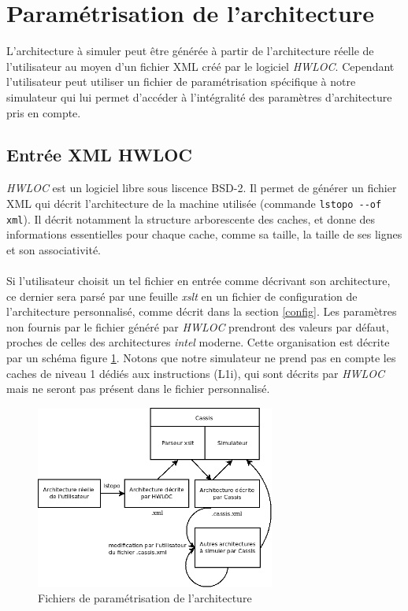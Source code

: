 \section{Paramétrisation de l'architecture}

\label{param_xml}
L'architecture à simuler peut être générée à partir de l'architecture réelle de l'utilisateur au moyen d'un fichier XML créé par le logiciel \emph{HWLOC}. Cependant l'utilisateur peut utiliser un fichier de paramétrisation spécifique à notre simulateur qui lui permet d'accéder à l'intégralité des paramètres d'architecture pris en compte.

\subsection{Entrée XML HWLOC}

\emph{HWLOC} est un logiciel libre sous liscence BSD-2. Il permet de générer un fichier XML qui décrit l'architecture de la machine utilisée (commande \verb?lstopo --of xml?). Il décrit notamment la structure arborescente des caches, et donne des informations essentielles pour chaque cache, comme sa taille, la taille de ses lignes et son associativité. 

\paragraph{}
Si l'utilisateur choisit un tel fichier en entrée comme décrivant son architecture, ce dernier sera parsé par une feuille \textit{xslt} en un fichier de configuration de l'architecture personnalisé, comme décrit dans la section \ref{config}. Les paramètres non fournis par le fichier généré par \emph{HWLOC} prendront des valeurs par défaut, proches de celles des architectures \emph{intel} moderne. Cette organisation est décrite par un schéma figure \ref{img:archi}. Notons que notre simulateur ne prend pas en compte les caches de niveau 1 dédiés aux instructions (L1i), qui sont décrits par \emph{HWLOC} mais ne seront pas présent dans le fichier personnalisé.

\begin{figure}[!h]
\begin{center}
   \includegraphics[width=0.7\textwidth]{images/schema_archi.png}
   \caption{\label{img:archi} Fichiers de paramétrisation de l'architecture}
\end{center}
\end{figure}

